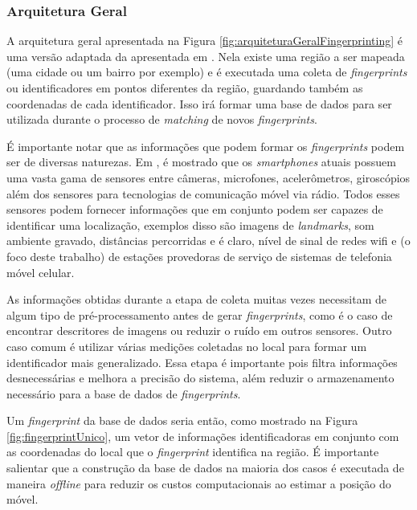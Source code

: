 \documentclass[12pt]{article}
\begin{document}
            \subsubsection{Arquitetura Geral}
            \label{sec:arquiteturaFingerprinting}

            A arquitetura geral apresentada na Figura \ref{fig:arquiteturaGeralFingerprinting} é uma versão adaptada da apresentada em \cite{surveyFingerprinting2016}. Nela existe uma região a ser mapeada (uma cidade ou um bairro por exemplo) e é executada uma coleta de \textit{fingerprints} ou identificadores em pontos diferentes da região, guardando também as coordenadas de cada identificador. Isso irá formar uma base de dados para ser utilizada durante o processo de  \textit{matching} de novos \textit{fingerprints}.
            
            É importante notar que as informações que podem formar os \textit{fingerprints} podem ser de diversas naturezas. Em \cite{surveyFingerprinting2016}, é mostrado que os \textit{smartphones} atuais possuem uma vasta gama de sensores entre câmeras, microfones, acelerômetros, giroscópios além dos sensores para tecnologias de comunicação móvel via rádio. Todos esses sensores podem fornecer informações que em conjunto podem ser capazes de identificar uma localização, exemplos disso são imagens de \textit{landmarks}, som ambiente gravado, distâncias percorridas e é claro, nível de sinal de redes wifi e (o foco deste trabalho) de estações provedoras de serviço de sistemas de telefonia móvel celular.
            
            As informações obtidas durante a etapa de coleta muitas vezes necessitam de algum tipo de pré-processamento antes de gerar \textit{fingerprints}, como é o caso de encontrar descritores de imagens ou reduzir o ruído em outros sensores. Outro caso comum é utilizar várias medições coletadas no local para formar um identificador mais generalizado. Essa etapa é importante pois filtra informações desnecessárias e melhora a precisão do sistema, além reduzir o armazenamento necessário para a base de dados de \textit{fingerprints}.
            
            Um \textit{fingerprint} da base de dados seria então, como mostrado na Figura \ref{fig:fingerprintUnico}, um vetor de informações identificadoras em conjunto com as coordenadas do local que o \textit{fingerprint} identifica na região. É importante salientar que a construção da base de dados na maioria dos casos é executada de maneira \textit{offline} para reduzir os custos computacionais ao estimar a posição do móvel.
            
\end{document}
